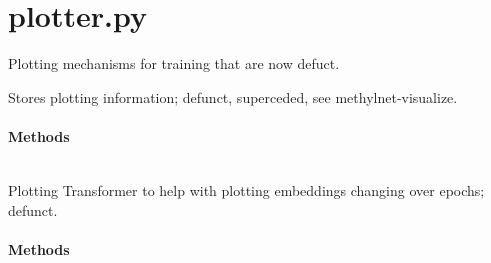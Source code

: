 \documentclass[letterpaper,10pt,english]{sphinxmanual}
\begin{document}
\label{\detokenize{index:module-methylnet.plotter}}

\chapter{plotter.py}
\label{\detokenize{index:plotter-py}}
Plotting mechanisms for training that are now defuct.

\begin{fulllineitems}
\label{\detokenize{index:methylnet.plotter.Plot}}
Stores plotting information; defunct, superceded, see methylnet-visualize.
\subsubsection*{Methods}


\begin{savenotes}\sphinxattablestart
\centering
\begin{tabulary}{\linewidth}[t]{|T|T|}
\hline

&\\
\hline
\end{tabulary}
\par
\sphinxattableend\end{savenotes}

\end{fulllineitems}


\begin{fulllineitems}
\label{\detokenize{index:methylnet.plotter.PlotTransformer}}
Plotting Transformer to help with plotting embeddings changing over epochs; defunct.
\subsubsection*{Methods}


\begin{savenotes}\sphinxattablestart
\centering
\begin{tabulary}{\linewidth}[t]{|T|T|}
\hline

&\\
\hline
\end{tabulary}
\par
\sphinxattableend\end{savenotes}

\end{fulllineitems}
\end{document}

